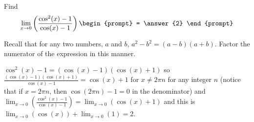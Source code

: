\documentclass{ximera}
\author{Matthew Carr}
\begin{document}
\begin{exercise}


Find
\[
\lim_{x\to0}\left(\frac{\cos^{2}(x)-1}{\cos(x)-1}\right)
\begin{prompt}
= \answer{2}
\end{prompt}
\]

\begin{hint}
Recall that for any two numbers, $a$ and $b$,  $a^2-b^2=(a-b)(a+b)$. Factor the numerator of the expression in this manner.
\end{hint}
\begin{hint}
$\cos^{2}(x)-1=(\cos(x)-1)(\cos(x)+1)$ so $\frac{(\cos(x)-1)(\cos(x)+1)}{\cos(x)-1}=\cos(x)+1$ for $x\ne2\pi{n}$ for any integer $n$ (notice that if $x=2\pi n$, then $\cos(2\pi n)-1=0$ in the denominator) and $\lim_{x\to0}\left(\frac{\cos^{2}(x)-1}{\cos(x)-1}\right)=\lim_{x\to0}\left(\cos(x)+1\right)$ and this is $\lim_{x\to0}\left(\cos(x)\right)+\lim_{x\to0}\left(1\right)=2$.

\end{hint}
\end{exercise}
\end{document}
